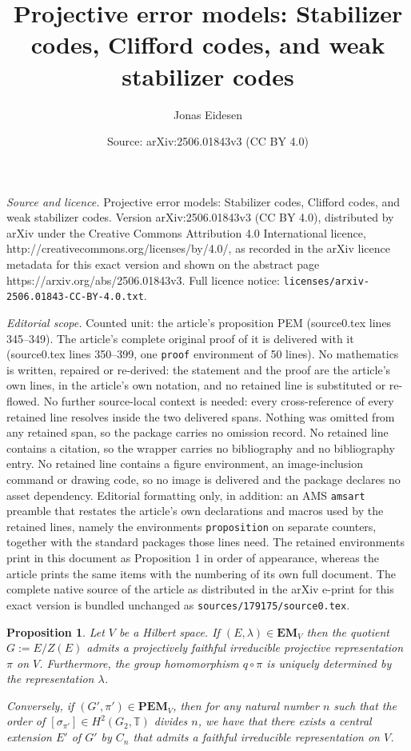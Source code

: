 \documentclass[10pt,a4paper]{amsart}
\title{Projective error models: Stabilizer codes, Clifford codes, and weak stabilizer codes}
\author{Jonas Eidesen}
\date{Source: arXiv:2506.01843v3 (CC BY 4.0)}
\newtheorem{proposition}{Proposition}
\newcommand{\EM}{\mathbf{EM}}
\newcommand{\PEM}{\mathbf{PEM}}
\newcommand{\bbT}{\mathbb{T}}
\begin{document}
\maketitle

\noindent\emph{Source and licence.} Projective error models: Stabilizer codes, Clifford codes, and weak stabilizer codes. Version arXiv:2506.01843v3 (CC BY 4.0), distributed by arXiv under the Creative Commons Attribution 4.0 International licence, http://creativecommons.org/licenses/by/4.0/, as recorded in the arXiv licence metadata for this exact version and shown on the abstract page https://arxiv.org/abs/2506.01843v3. Full licence notice: \texttt{licenses/arxiv-2506.01843-CC-BY-4.0.txt}.\par\smallskip

\noindent\textit{Editorial scope.} Counted unit: the article's proposition PEM (source0.tex lines 345--349). The article's complete original proof of it is delivered with it (source0.tex lines 350--399, one \texttt{proof} environment of 50 lines). No mathematics is written, repaired or re-derived: the statement and the proof are the article's own lines, in the article's own notation, and no retained line is substituted or re-flowed.  No further source-local context is needed: every cross-reference of every retained line resolves inside the two delivered spans.  Nothing was omitted from any retained span, so the package carries no omission record.  No retained line contains a citation, so the wrapper carries no bibliography and no bibliography entry.  No retained line contains a figure environment, an image-inclusion command or drawing code, so no image is delivered and the package declares no asset dependency.  Editorial formatting only, in addition: an AMS \texttt{amsart} preamble that restates the article's own declarations and macros used by the retained lines, namely the environments \texttt{proposition} on separate counters, together with the standard packages those lines need.  The retained environments print in this document as Proposition 1 in order of appearance, whereas the article prints the same items with the numbering of its own full document.  The complete native source of the article as distributed in the arXiv e-print for this exact version is bundled unchanged as \texttt{sources/179175/source0.tex}.
\begin{proposition}\label{prop:correspondence between EM and PEM}
    Let $V$ be a Hilbert space. If $(E,\lambda) \in \EM_V$ then the quotient $G := E/Z(E)$ admits a projectively faithful irreducible projective representation $\pi$ on $V$. Furthermore, the group homomorphism $q \circ \pi$ is uniquely determined by the representation $\lambda$.

    Conversely, if $(G',\pi') \in \PEM_V$, then for any natural number $n$ such that the order of $[\sigma_{\pi'}] \in H^2(G_2,\bbT)$ divides $n$, we have that there exists a central extension $E'$ of $G'$ by $C_n$ that admits a faithful irreducible representation on $V$.
\end{proposition}
\end{document}
